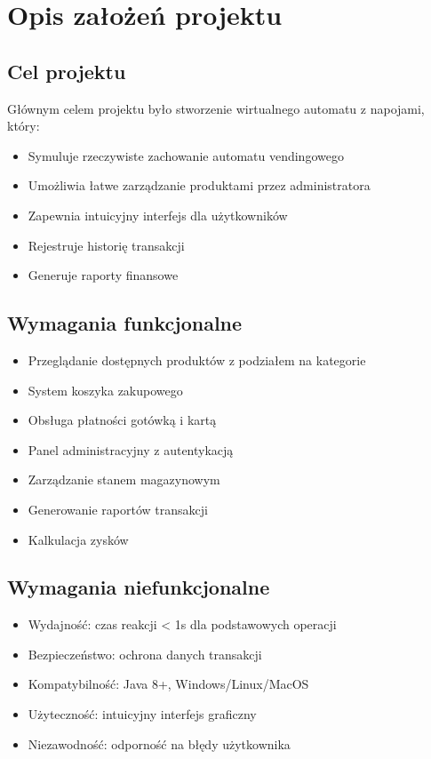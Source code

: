 \section{Opis założeń projektu}
\subsection{Cel projektu}
Głównym celem projektu było stworzenie wirtualnego automatu z napojami, który:
\begin{itemize}
\item Symuluje rzeczywiste zachowanie automatu vendingowego
\item Umożliwia łatwe zarządzanie produktami przez administratora
\item Zapewnia intuicyjny interfejs dla użytkowników
\item Rejestruje historię transakcji
\item Generuje raporty finansowe
\end{itemize}




\subsection{Wymagania funkcjonalne}
\begin{itemize}
\item Przeglądanie dostępnych produktów z podziałem na kategorie
\item System koszyka zakupowego
\item Obsługa płatności gotówką i kartą
\item Panel administracyjny z autentykacją
\item Zarządzanie stanem magazynowym
\item Generowanie raportów transakcji
\item Kalkulacja zysków 
\end{itemize}


\subsection{Wymagania niefunkcjonalne}
\begin{itemize}
\item Wydajność: czas reakcji < 1s dla podstawowych operacji
\item Bezpieczeństwo: ochrona danych transakcji
\item Kompatybilność: Java 8+, Windows/Linux/MacOS
\item Użyteczność: intuicyjny interfejs graficzny
\item Niezawodność: odporność na błędy użytkownika
\end{itemize}